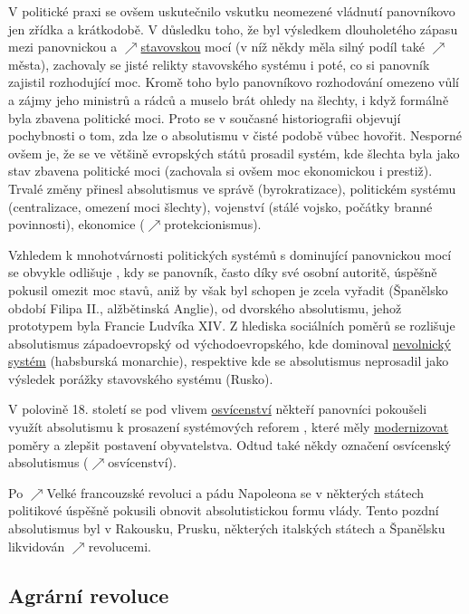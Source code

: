 \documentclass{article}
\begin{document}
  V politické praxi se ovšem uskutečnilo vskutku neomezené vládnutí panovníkovo jen zřídka a krátkodobě. V důsledku toho, že byl výsledkem dlouholetého zápasu mezi panovnickou a $\nearrow$\hyperref[sec:stavy]{stavovskou} mocí (v níž někdy měla silný podíl také $\nearrow$města), zachovaly se jisté relikty stavovského systému i poté, co si panovník zajistil rozhodující moc. Kromě toho bylo panovníkovo rozhodování omezeno vůlí a zájmy jeho ministrů a rádců a muselo brát ohledy na  šlechty, i když formálně byla zbavena politické moci. Proto se v současné historiografii objevují pochybnosti o tom, zda lze o absolutismu v čisté podobě vůbec hovořit. Nesporné ovšem je, že se ve většině evropských států prosadil systém, kde šlechta byla jako stav zbavena politické moci (zachovala si ovšem moc ekonomickou i prestiž). Trvalé změny přinesl absolutismus ve správě (byrokratizace), politickém systému (centralizace, omezení moci šlechty), vojenství (stálé vojsko, počátky branné povinnosti), ekonomice ($\nearrow$protekcionismus).

  Vzhledem k mnohotvárnosti politických systémů s dominující panovnickou mocí se obvykle odlišuje , kdy se panovník, často díky své osobní autoritě, úspěšně pokusil omezit moc stavů, aniž by však byl schopen je zcela vyřadit (Španělsko období Filipa II., alžbětinská Anglie), od  dvorského absolutismu, jehož prototypem byla Francie Ludvíka XIV. Z hlediska sociálních poměrů se rozlišuje absolutismus západoevropský od východoevropského, kde dominoval \hyperref[sec:nevolnictvi]{nevolnický systém} (habsburská monarchie), respektive kde se absolutismus neprosadil jako výsledek porážky stavovského systému (Rusko).

  V polovině 18. století se pod vlivem \hyperref[sec:osvicenstvi]{osvícenství} někteří panovníci pokoušeli využít absolutismu k prosazení systémových reforem , které měly \hyperref[sec:modernizace]{modernizovat} poměry a zlepšit postavení obyvatelstva. Odtud také někdy označení osvícenský absolutismus ($\nearrow$osvícenství).

  Po $\nearrow$Velké francouzské revoluci a pádu Napoleona se v některých státech politikové úspěšně pokusili obnovit absolutistickou formu vlády. Tento pozdní absolutismus byl v Rakousku, Prusku, některých italských státech a Španělsku likvidován $\nearrow$revolucemi.

  \subsection*{Agrární revoluce~\cite{Hroch:}}
  \label{sec:agrarniRevoluce}
\end{document}
